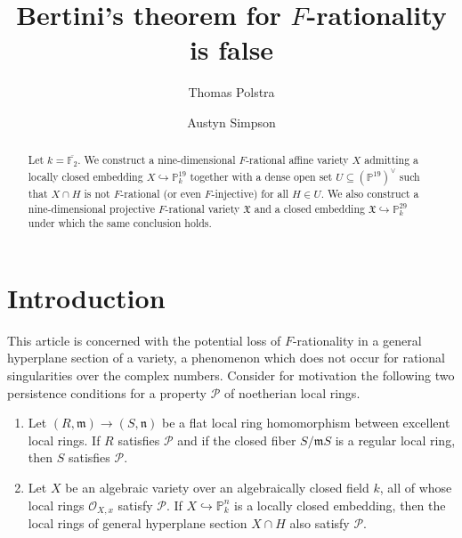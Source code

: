 \documentclass[reqno,11pt]{amsart}
\numberwithin{equation}{section}
\theoremstyle{definition}
\theoremstyle{definition}
\theoremstyle{definition}
\theoremstyle{remark}
\newcommand{\F}{\mathbb{F}}
\newcommand{\PP}{\mathbb{P}}
\newcommand{\fm}{\mathfrak{m}}
\newcommand{\fn}{\mathfrak{n}}
\newcommand{\cO}{\mathcal{O}}
\newcommand{\cP}{\mathcal{P}}
\begin{document}
\title{Bertini's theorem for \texorpdfstring{$F$}{F}-rationality is false}



\author[Polstra]{Thomas Polstra}
\address{Department of Mathematics, University of Alabama, Tuscaloosa, AL 35487 USA}

\author[Simpson]{Austyn Simpson}
\address{Department of Mathematics, Bates College, 3 Andrews Rd, Lewiston, ME 04240 USA}




\begin{abstract}
    Let $k=\overline{\F_2}$. We construct a nine-dimensional $F$-rational affine variety $X$ admitting a locally closed embedding $X\hookrightarrow \PP_k^{19}$ together with a dense open set $U\subseteq (\PP^{19})^\vee$ such that $X\cap H$ is not $F$-rational (or even $F$-injective) for all $H\in U$. We also construct a nine-dimensional projective $F$-rational variety $\mathfrak{X}$ and a closed embedding  $\mathfrak{X}\hookrightarrow\mathbb{P}^{29}_k$ under which the same conclusion holds.
\end{abstract}

\maketitle



\section{Introduction}
This article is concerned with the potential loss of $F$-rationality in a general hyperplane section of a variety, a phenomenon which does not occur for rational singularities over the complex numbers. Consider for motivation the following two persistence conditions for a property $\cP$ of noetherian local rings.

\begin{enumerate}[label=(\Roman*)]
    \item Let $(R,\fm)\to (S,\fn)$ be a flat local ring homomorphism between excellent local rings. If $R$ satisfies $\cP$ and if the closed fiber $S/\fm S$ is a regular local ring, then $S$ satisfies $\cP$.\label{I}
    \item Let $X$ be an algebraic variety over an algebraically closed field $k$, all of whose local rings $\cO_{X,x}$ satisfy $\cP$. If $X\hookrightarrow \PP^n_k$ is a locally closed embedding, then the local rings of general hyperplane section $X\cap H$ also satisfy $\cP$.\label{II}
\end{enumerate}
\end{document}

